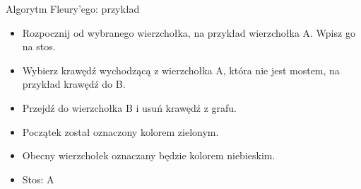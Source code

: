 \documentclass[polish,envcountsect,10pt]{beamer}
\begin{document}
\begin{frame}{Algorytm Fleury'ego: przykład}
    \begin{itemize}
        \item Rozpocznij od wybranego wierzchołka, na przykład wierzchołka A. Wpisz go na stos.
        \item Wybierz krawędź wychodzącą z wierzchołka A, która nie jest mostem, na przykład krawędź do B.
        \item Przejdź do wierzchołka B i usuń krawędź z grafu.
        \item Początek został oznaczony kolorem zielonym.
        \item Obecny wierzchołek oznaczany będzie kolorem niebieskim.
        \item Stos: A
    \end{itemize}
    \begin{center}
    \end{center}
\end{frame}
\end{document}
